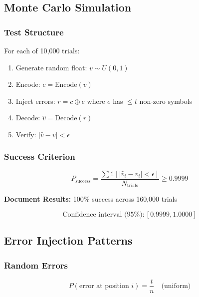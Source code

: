 \documentclass[11pt,a4paper]{article}
\begin{document}
\subsection{Monte Carlo Simulation}

\subsubsection{Test Structure}

For each of 10,000 trials:

\begin{enumerate}
    \item Generate random float: $v \sim U(0, 1)$
    \item Encode: $c = \text{Encode}(v)$
    \item Inject errors: $r = c \oplus e$ where $e$ has $\leq t$ non-zero symbols
    \item Decode: $\hat{v} = \text{Decode}(r)$
    \item Verify: $|\hat{v} - v| < \epsilon$
\end{enumerate}

\subsubsection{Success Criterion}

\begin{equation}
P_{\text{success}} = \frac{\sum \mathbb{1}[|\hat{v}_i - v_i| < \epsilon]}{N_{\text{trials}}} \geq 0.9999
\end{equation}

\textbf{Document Results:} 100\% success across 160,000 trials

\begin{equation}
\text{Confidence interval (95\%)}: [0.9999, 1.0000]
\end{equation}

\subsection{Error Injection Patterns}

\subsubsection{Random Errors}

\begin{equation}
P(\text{error at position } i) = \frac{t}{n} \quad \text{(uniform)}
\end{equation}
\end{document}
